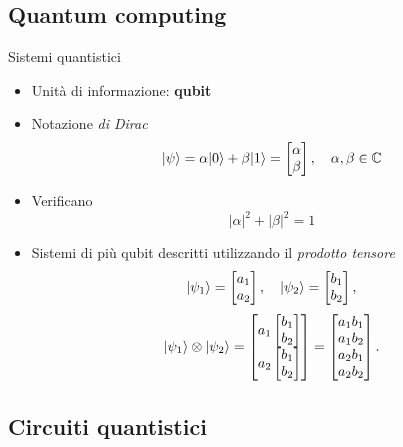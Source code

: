\documentclass{beamer}
\DeclarePairedDelimiter\ket{\lvert}{\rangle}
\begin{document}
	\subsection{Quantum computing}

	\begin{frame}{Sistemi quantistici}
		\begin{itemize}
			\item Unità  di informazione: \textbf{qubit}
			\item Notazione \emph{di Dirac}
			\[
			\ket{\psi} = \alpha\ket{0} + \beta\ket{1} = \begin{bmatrix}
				\alpha\\\beta
			\end{bmatrix},\quad \alpha,\beta \in \mathbb{C}
			\]
			\item Verificano
			\[
			|\alpha|^2 + |\beta|^2 = 1
			\]
			\pause
			\item Sistemi di più qubit descritti utilizzando il \emph{prodotto tensore}
			\[
				\ket{\psi_1} = \begin{bmatrix} a_1 \\ a_2 \end{bmatrix}, \quad \ket{\psi_2} = \begin{bmatrix} b_1 \\ b_2 \end{bmatrix},
			\]
			\[
				\ket{\psi_1} \otimes \ket{\psi_2}
				= \begin{bmatrix}
					a_1 \begin{bmatrix} b_1 \\ b_2 \end{bmatrix} \\
						a_2 \begin{bmatrix} b_1 \\ b_2 \end{bmatrix}
				\end{bmatrix} =
				\begin{bmatrix}
					a_1 b_1 \\ a_1 b_2 \\ a_2 b_1 \\ a_2 b_2
				\end{bmatrix}.
			\]
		\end{itemize}
	\end{frame}


	\subsection{Circuiti quantistici}
\end{document}
